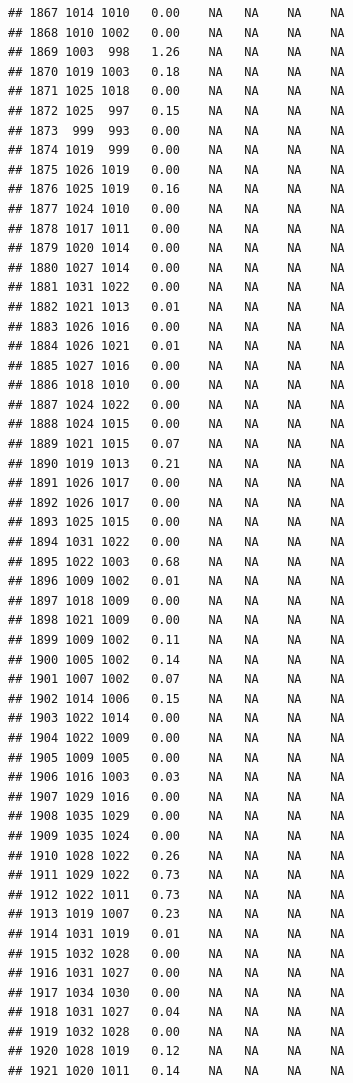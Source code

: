 \documentclass{article}\usepackage{graphicx, color}
\makeatletter
\newenvironment{kframe}{%
 \def\at@end@of@kframe{}%
 \ifinner\ifhmode%
  \def\at@end@of@kframe{\end{minipage}}%
  \begin{minipage}{\columnwidth}%
 \fi\fi%
 \def\FrameCommand##1{\hskip\@totalleftmargin \hskip-\fboxsep
 \colorbox{shadecolor}{##1}\hskip-\fboxsep
     \hskip-\linewidth \hskip-\@totalleftmargin \hskip\columnwidth}%
 \MakeFramed {\advance\hsize-\width
   \@totalleftmargin\z@ \linewidth\hsize
   \@setminipage}}%
 {\par\unskip\endMakeFramed%
 \at@end@of@kframe}
\newenvironment{knitrout}{}{} %
\makeatother
\begin{document}
\begin{knitrout}
\begin{kframe}
\begin{verbatim}
## 1867 1014 1010   0.00    NA   NA    NA    NA
## 1868 1010 1002   0.00    NA   NA    NA    NA
## 1869 1003  998   1.26    NA   NA    NA    NA
## 1870 1019 1003   0.18    NA   NA    NA    NA
## 1871 1025 1018   0.00    NA   NA    NA    NA
## 1872 1025  997   0.15    NA   NA    NA    NA
## 1873  999  993   0.00    NA   NA    NA    NA
## 1874 1019  999   0.00    NA   NA    NA    NA
## 1875 1026 1019   0.00    NA   NA    NA    NA
## 1876 1025 1019   0.16    NA   NA    NA    NA
## 1877 1024 1010   0.00    NA   NA    NA    NA
## 1878 1017 1011   0.00    NA   NA    NA    NA
## 1879 1020 1014   0.00    NA   NA    NA    NA
## 1880 1027 1014   0.00    NA   NA    NA    NA
## 1881 1031 1022   0.00    NA   NA    NA    NA
## 1882 1021 1013   0.01    NA   NA    NA    NA
## 1883 1026 1016   0.00    NA   NA    NA    NA
## 1884 1026 1021   0.01    NA   NA    NA    NA
## 1885 1027 1016   0.00    NA   NA    NA    NA
## 1886 1018 1010   0.00    NA   NA    NA    NA
## 1887 1024 1022   0.00    NA   NA    NA    NA
## 1888 1024 1015   0.00    NA   NA    NA    NA
## 1889 1021 1015   0.07    NA   NA    NA    NA
## 1890 1019 1013   0.21    NA   NA    NA    NA
## 1891 1026 1017   0.00    NA   NA    NA    NA
## 1892 1026 1017   0.00    NA   NA    NA    NA
## 1893 1025 1015   0.00    NA   NA    NA    NA
## 1894 1031 1022   0.00    NA   NA    NA    NA
## 1895 1022 1003   0.68    NA   NA    NA    NA
## 1896 1009 1002   0.01    NA   NA    NA    NA
## 1897 1018 1009   0.00    NA   NA    NA    NA
## 1898 1021 1009   0.00    NA   NA    NA    NA
## 1899 1009 1002   0.11    NA   NA    NA    NA
## 1900 1005 1002   0.14    NA   NA    NA    NA
## 1901 1007 1002   0.07    NA   NA    NA    NA
## 1902 1014 1006   0.15    NA   NA    NA    NA
## 1903 1022 1014   0.00    NA   NA    NA    NA
## 1904 1022 1009   0.00    NA   NA    NA    NA
## 1905 1009 1005   0.00    NA   NA    NA    NA
## 1906 1016 1003   0.03    NA   NA    NA    NA
## 1907 1029 1016   0.00    NA   NA    NA    NA
## 1908 1035 1029   0.00    NA   NA    NA    NA
## 1909 1035 1024   0.00    NA   NA    NA    NA
## 1910 1028 1022   0.26    NA   NA    NA    NA
## 1911 1029 1022   0.73    NA   NA    NA    NA
## 1912 1022 1011   0.73    NA   NA    NA    NA
## 1913 1019 1007   0.23    NA   NA    NA    NA
## 1914 1031 1019   0.01    NA   NA    NA    NA
## 1915 1032 1028   0.00    NA   NA    NA    NA
## 1916 1031 1027   0.00    NA   NA    NA    NA
## 1917 1034 1030   0.00    NA   NA    NA    NA
## 1918 1031 1027   0.04    NA   NA    NA    NA
## 1919 1032 1028   0.00    NA   NA    NA    NA
## 1920 1028 1019   0.12    NA   NA    NA    NA
## 1921 1020 1011   0.14    NA   NA    NA    NA

\end{verbatim}
\end{kframe}
\end{knitrout}
\end{document}
